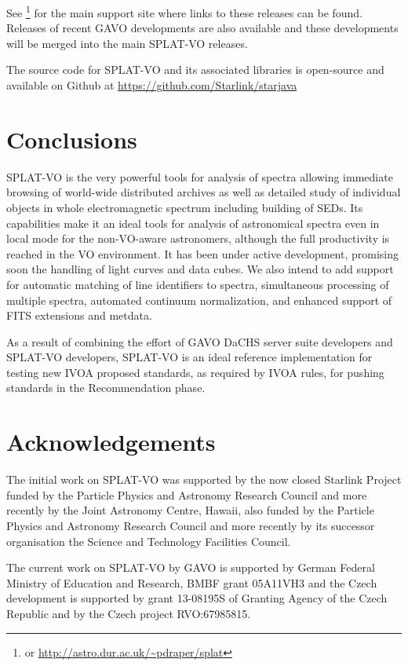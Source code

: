\documentclass[final,authoryear,5p,times,twocolumn]{elsarticle}
\begin{document}
See \footnote{or \url{http://astro.dur.ac.uk/~pdraper/splat}}
for the main support site where links to these releases can be found.
Releases of recent GAVO developments are also available and these
developments will be merged into the main SPLAT-VO releases.

The source code for SPLAT-VO and its associated libraries is
open-source and available on Github at
\url{https://github.com/Starlink/starjava}


\section{Conclusions}

SPLAT-VO is the very powerful tools for analysis of spectra
allowing immediate browsing of world-wide distributed archives as well
as detailed study of individual objects in whole electromagnetic
spectrum including building of SEDs. Its capabilities make it an
ideal tools for analysis of astronomical spectra even in local mode
for the non-VO-aware astronomers, although the full productivity is
reached in the VO environment. It has been under active development, promising soon the handling of
light curves and data cubes. We also intend to add support for
automatic matching of line identifiers to spectra, simultaneous
processing of multiple spectra, automated continuum normalization, and
enhanced support of FITS extensions and metdata.

As a result of combining the effort of GAVO DaCHS server suite
developers and SPLAT-VO developers, SPLAT-VO is an ideal reference
implementation for testing new IVOA proposed standards, as required by
IVOA rules, for pushing standards in the Recommendation phase.

\section*{Acknowledgements}

The initial work on SPLAT-VO was supported
by the now closed Starlink Project funded by the Particle Physics and
Astronomy Research Council and more recently by the Joint Astronomy
Centre, Hawaii, also funded by the Particle Physics and Astronomy
Research Council and more recently by its successor organisation the
Science and Technology Facilities Council.

The current work on SPLAT-VO by GAVO is supported by German Federal
Ministry of Education and Research, BMBF grant 05A11VH3 and the Czech
development is supported by grant 13-08195S of Granting Agency of the
Czech Republic and by the Czech project RVO:67985815.
\end{document}
